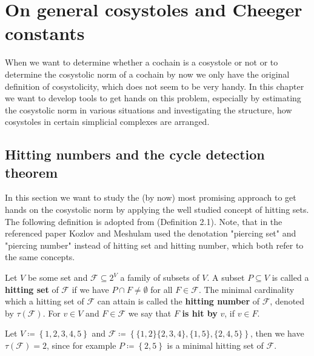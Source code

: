
\chapter{On general cosystoles and Cheeger constants}

\label{Chapter2}

When we want to determine whether a cochain is a cosystole or not or to determine the cosystolic norm of a cochain by now we only have the original definition of cosystolicity, which does not seem to be very handy. In this chapter we want to develop tools to get hands on this problem, especially by estimating the cosystolic norm in various situations and investigating the structure, how cosystoles in certain simplicial complexes are arranged.

\section{Hitting numbers and the cycle detection theorem}

In this section we want to study the (by now) most promising approach to get hands on the cosystolic norm by applying the well studied concept of hitting sets. The following definition is adopted from \cite{6} (Definition 2.1). Note, that in the referenced paper Kozlov and Meshulam used the denotation "piercing set" and "piercing number" instead of hitting set and hitting number, which both refer to the same concepts.

\begin{defi}
Let \(V\) be some set and \(\mathcal{F}\subseteq 2^V\) a family of subsets of \(V\). A subset \(P\subseteq V\) is called a \textbf{hitting set} of \(\mathcal{F}\) if we have \(P\cap F\neq\emptyset\) for all \(F\in\mathcal{F}\). The minimal cardinality which a hitting set of \(\mathcal{F}\) can attain is called the \textbf{hitting number} of \(\mathcal{F}\), denoted by \(\tau(\mathcal{F})\). For \(v\in V\) and \(F\in\mathcal{F}\) we say that \(F\) \textbf{is hit by} \(v\), if \(v\in F\).
\end{defi}

\begin{expl}\label{example1}
Let \(V\coloneqq \left\{1,2,3,4,5\right\}\) and \(\mathcal{F}\coloneqq \left\{\{1,2\}\{2,3,4\},\{1,5\},\{2,4,5\}\right\}\), then we have \(\tau(\mathcal{F})=2\), since for example \(P\coloneqq \left\{2,5\right\}\) is a minimal hitting set of \(\mathcal{F}\).
\end{expl}


